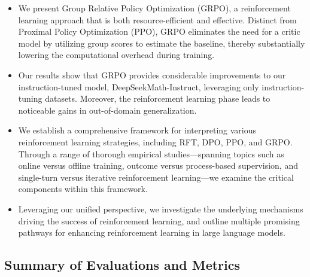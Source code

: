 \begin{itemize}[topsep=0pt]
    \item We present Group Relative Policy Optimization (GRPO), a reinforcement learning approach that is both resource-efficient and effective. Distinct from Proximal Policy Optimization (PPO), GRPO eliminates the need for a critic model by utilizing group scores to estimate the baseline, thereby substantially lowering the computational overhead during training.
    \item Our results show that GRPO provides considerable improvements to our instruction-tuned model, DeepSeekMath-Instruct, leveraging only instruction-tuning datasets. Moreover, the reinforcement learning phase leads to noticeable gains in out-of-domain generalization.
    \item We establish a comprehensive framework for interpreting various reinforcement learning strategies, including RFT, DPO, PPO, and GRPO. Through a range of thorough empirical studies—spanning topics such as online versus offline training, outcome versus process-based supervision, and single-turn versus iterative reinforcement learning—we examine the critical components within this framework.
    \item Leveraging our unified perspective, we investigate the underlying mechanisms driving the success of reinforcement learning, and outline multiple promising pathways for enhancing reinforcement learning in large language models.
\end{itemize}

\subsection{Summary of Evaluations and Metrics}

